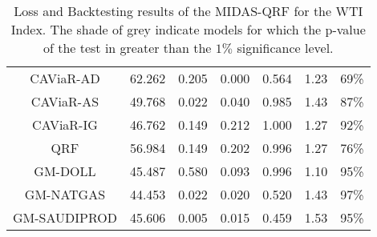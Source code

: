 \begin{table}[H]
\begin{tabular}{ccccccc}
CAViaR-AD                                               & 62.262 & 0.205    & 0.000    & 0.564    & 1.23 & 69\%   \\
\rowcolor[HTML]{D9D9D9}CAViaR-AS                                               & 49.768 & 0.022    & 0.040    & 0.985    & 1.43 & 87\%   \\
\rowcolor[HTML]{D9D9D9} CAViaR-IG  & 46.762 & 0.149    & 0.212    & 1.000    & 1.27 & 92\%   \\
\rowcolor[HTML]{D9D9D9} QRF        & 56.984 & 0.149    & 0.202    & 0.996    & 1.27 & 76\%   \\
\rowcolor[HTML]{D9D9D9} GM-DOLL    & 45.487 & 0.580    & 0.093    & 0.996    & 1.10 & 95\%   \\
\rowcolor[HTML]{D9D9D9}GM-NATGAS                                               & 44.453 & 0.022    & 0.020    & 0.520    & 1.43 & 97\%   \\
GM-SAUDIPROD                                            & 45.606 & 0.005    & 0.015    & 0.459    & 1.53 & 95\%  
\\ \hline
\end{tabular}
\caption{Loss and Backtesting results of the MIDAS-QRF for the WTI Index.  The shade of grey indicate models for which the p-value of the test in greater than the $1\%$ significance level.}
\label{tab:wti}
\end{table}
